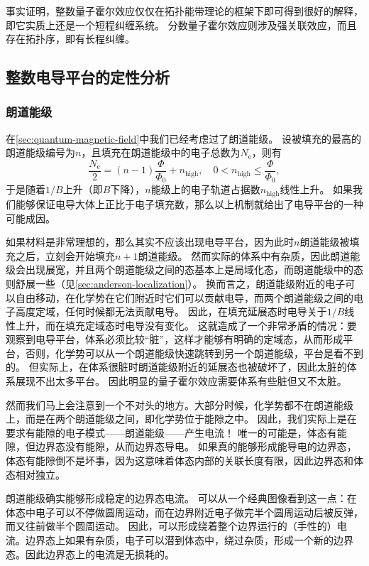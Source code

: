 事实证明，整数量子霍尔效应仅仅在拓扑能带理论的框架下即可得到很好的解释，即它实质上还是一个短程纠缠系统。
分数量子霍尔效应则涉及强关联效应，而且存在拓扑序，即有长程纠缠。

\subsection{整数电导平台的定性分析}

\subsubsection{朗道能级}

在\autoref{sec:quantum-magnetic-field}中我们已经考虑过了朗道能级。
设被填充的最高的朗道能级编号为$n$，且填充在朗道能级中的电子总数为$N_\text{e}$，则有
\[
    \frac{N_\text{e}}{2} = (n-1) \frac{\Phi}{\Phi_0} + n_\text{high}, \quad 0 < n_\text{high} \leq \frac{\Phi}{\Phi_0},
\]
于是随着$1/B$上升（即$B$下降），$n$能级上的电子轨道占据数$n_\text{high}$线性上升。
如果我们能够保证电导大体上正比于电子填充数，那么以上机制就给出了电导平台的一种可能成因。

如果材料是非常理想的，那么其实不应该出现电导平台，因为此时$n$朗道能级被填充之后，立刻会开始填充$n+1$朗道能级。
然而实际的体系中有杂质，因此朗道能级会出现展宽，并且两个朗道能级之间的态基本上是局域化态，而朗道能级中的态则舒展一些（见\autoref{sec:anderson-localization}）。
换而言之，朗道能级附近的电子可以自由移动，在化学势在它们附近时它们可以贡献电导，而两个朗道能级之间的电子高度定域，任何时候都无法贡献电导。
因此，在填充延展态时电导关于$1/B$线性上升，而在填充定域态时电导没有变化。
这就造成了一个非常矛盾的情况：要观察到电导平台，体系必须比较“脏”，这样才能够有明确的定域态，从而形成平台，否则，化学势可以从一个朗道能级快速跳转到另一个朗道能级，平台是看不到的。
但实际上，在体系很脏时朗道能级附近的延展态也被破坏了，因此太脏的体系展现不出太多平台。
因此明显的量子霍尔效应需要体系有些脏但又不太脏。

然而我们马上会注意到一个不对头的地方。大部分时候，化学势都不在朗道能级上，而是在两个朗道能级之间，即化学势位于能隙之中。
因此，我们实际上是在要求有能隙的电子模式——朗道能级——产生电流！
唯一的可能是，体态有能隙，但边界态没有能隙，从而边界态导电。
如果真的能够形成能导电的边界态，体态有能隙倒不是坏事，因为这意味着体态内部的关联长度有限，因此边界态和体态相对独立。

朗道能级确实能够形成稳定的边界态电流。
可以从一个经典图像看到这一点：在体态中电子可以不停做圆周运动，而在边界附近电子做完半个圆周运动后被反弹，而又往前做半个圆周运动。
因此，可以形成绕着整个边界运行的（手性的）电流。边界态上如果有杂质，电子可以潜到体态中，绕过杂质，形成一个新的边界态。因此边界态上的电流是无损耗的。

